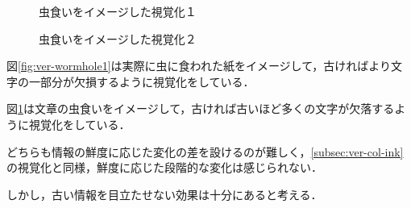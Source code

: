 \begin{figure}[htbp]
  \begin{minipage}{0.5\hsize}
    \begin{center}
    \end{center}
    \caption{虫食いをイメージした視覚化１}
    \label{fig:ver-wormhole1}
  \end{minipage}
  \begin{minipage}{0.5\hsize}
    \begin{center}
    \end{center}
    \caption{虫食いをイメージした視覚化２}
    \label{fig:ver-wormhole2}
  \end{minipage}
\end{figure}

図\ref{fig:ver-wormhole1}は実際に虫に食われた紙をイメージして，古ければより文字の一部分が欠損するように視覚化をしている．

図\ref{fig:ver-wormhole2}は文章の虫食いをイメージして，古ければ古いほど多くの文字が欠落するように視覚化をしている．

どちらも情報の鮮度に応じた変化の差を設けるのが難しく，\ref{subsec:ver-col-ink}の視覚化と同様，鮮度に応じた段階的な変化は感じられない．

しかし，古い情報を目立たせない効果は十分にあると考える．

